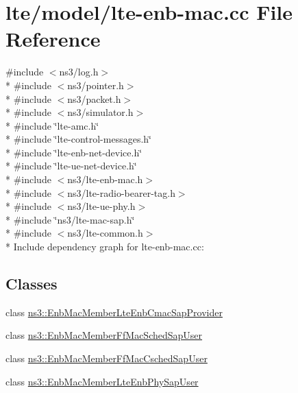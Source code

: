 \hypertarget{lte-enb-mac_8cc}{}\section{lte/model/lte-\/enb-\/mac.cc File Reference}
\label{lte-enb-mac_8cc}
{\ttfamily \#include $<$ns3/log.\+h$>$}\\*
{\ttfamily \#include $<$ns3/pointer.\+h$>$}\\*
{\ttfamily \#include $<$ns3/packet.\+h$>$}\\*
{\ttfamily \#include $<$ns3/simulator.\+h$>$}\\*
{\ttfamily \#include \char`\"{}lte-\/amc.\+h\char`\"{}}\\*
{\ttfamily \#include \char`\"{}lte-\/control-\/messages.\+h\char`\"{}}\\*
{\ttfamily \#include \char`\"{}lte-\/enb-\/net-\/device.\+h\char`\"{}}\\*
{\ttfamily \#include \char`\"{}lte-\/ue-\/net-\/device.\+h\char`\"{}}\\*
{\ttfamily \#include $<$ns3/lte-\/enb-\/mac.\+h$>$}\\*
{\ttfamily \#include $<$ns3/lte-\/radio-\/bearer-\/tag.\+h$>$}\\*
{\ttfamily \#include $<$ns3/lte-\/ue-\/phy.\+h$>$}\\*
{\ttfamily \#include \char`\"{}ns3/lte-\/mac-\/sap.\+h\char`\"{}}\\*
{\ttfamily \#include $<$ns3/lte-\/common.\+h$>$}\\*
Include dependency graph for lte-\/enb-\/mac.cc\+:
\subsection*{Classes}
\begin{DoxyCompactItemize}
\item 
class \hyperlink{classns3_1_1EnbMacMemberLteEnbCmacSapProvider}{ns3\+::\+Enb\+Mac\+Member\+Lte\+Enb\+Cmac\+Sap\+Provider}
\item 
class \hyperlink{classns3_1_1EnbMacMemberFfMacSchedSapUser}{ns3\+::\+Enb\+Mac\+Member\+Ff\+Mac\+Sched\+Sap\+User}
\item 
class \hyperlink{classns3_1_1EnbMacMemberFfMacCschedSapUser}{ns3\+::\+Enb\+Mac\+Member\+Ff\+Mac\+Csched\+Sap\+User}
\item 
class \hyperlink{classns3_1_1EnbMacMemberLteEnbPhySapUser}{ns3\+::\+Enb\+Mac\+Member\+Lte\+Enb\+Phy\+Sap\+User}
\end{DoxyCompactItemize}
